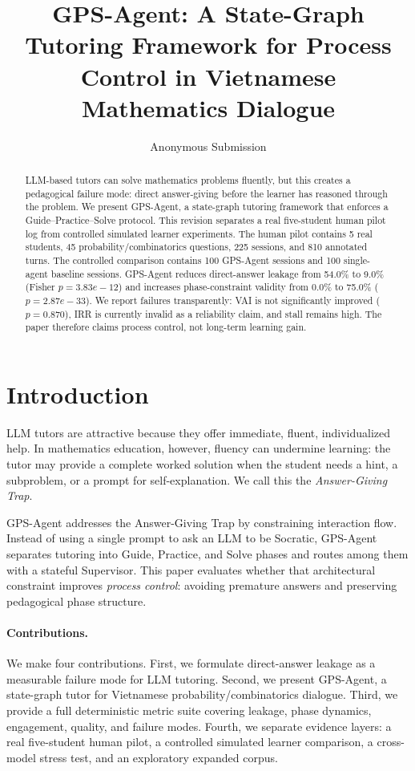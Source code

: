 \documentclass[11pt]{article}
\title{GPS-Agent: A State-Graph Tutoring Framework for Process Control in Vietnamese Mathematics Dialogue}
\author{Anonymous Submission}
\begin{document}
\maketitle
\begin{abstract}
LLM-based tutors can solve mathematics problems fluently, but this creates a pedagogical failure mode: direct answer-giving before the learner has reasoned through the problem. We present GPS-Agent, a state-graph tutoring framework that enforces a Guide--Practice--Solve protocol. This revision separates a real five-student human pilot log from controlled simulated learner experiments. The human pilot contains 5 real students, 45 probability/combinatorics questions, 225 sessions, and 810 annotated turns. The controlled comparison contains 100 GPS-Agent sessions and 100 single-agent baseline sessions. GPS-Agent reduces direct-answer leakage from 54.0\% to 9.0\% (Fisher $p=3.83e-12$) and increases phase-constraint validity from 0.0\% to 75.0\% ($p=2.87e-33$). We report failures transparently: VAI is not significantly improved ($p=0.870$), IRR is currently invalid as a reliability claim, and stall remains high. The paper therefore claims process control, not long-term learning gain.
\end{abstract}

\section{Introduction}
LLM tutors are attractive because they offer immediate, fluent, individualized help. In mathematics education, however, fluency can undermine learning: the tutor may provide a complete worked solution when the student needs a hint, a subproblem, or a prompt for self-explanation. We call this the \emph{Answer-Giving Trap}.

GPS-Agent addresses the Answer-Giving Trap by constraining interaction flow. Instead of using a single prompt to ask an LLM to be Socratic, GPS-Agent separates tutoring into Guide, Practice, and Solve phases and routes among them with a stateful Supervisor. This paper evaluates whether that architectural constraint improves \emph{process control}: avoiding premature answers and preserving pedagogical phase structure.

\paragraph{Contributions.} We make four contributions. First, we formulate direct-answer leakage as a measurable failure mode for LLM tutoring. Second, we present GPS-Agent, a state-graph tutor for Vietnamese probability/combinatorics dialogue. Third, we provide a full deterministic metric suite covering leakage, phase dynamics, engagement, quality, and failure modes. Fourth, we separate evidence layers: a real five-student human pilot, a controlled simulated learner comparison, a cross-model stress test, and an exploratory expanded corpus.
\end{document}
